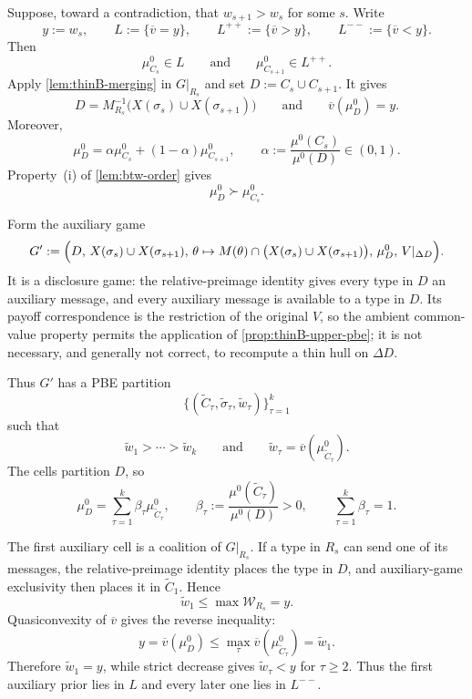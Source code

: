\documentclass[11pt]{article}
\newcommand{\W}{\mathcal{W}}
\begin{document}
Suppose, toward a contradiction, that $w_{s+1}>w_s$ for some $s$. Write
\[
    y:=w_s,\qquad
    L:=\{\overline v=y\},\qquad
    L^{++}:=\{\overline v>y\},\qquad
    L^{--}:=\{\overline v<y\}.
\]
Then
\[
    \mu^0_{C_s}\in L
    \qquad\text{and}\qquad
    \mu^0_{C_{s+1}}\in L^{++}.
\]
Apply \cref{lem:thinB-merging} in $G\vert_{R_s}$ and set $D:=C_s\cup C_{s+1}$. It gives
\[
    D=M^{-1}_{R_s}\bigl(X(\sigma_s)\cup X(\sigma_{s+1})\bigr)
    \qquad\text{and}\qquad
    \overline v(\mu^0_D)=y.
\]
Moreover,
\[
    \mu^0_D
    =
    \alpha\mu^0_{C_s}+(1-\alpha)\mu^0_{C_{s+1}},
    \qquad
    \alpha:=\frac{\mu^0(C_s)}{\mu^0(D)}\in(0,1).
\]
Property~(i) of \cref{lem:btw-order} gives
\begin{equation}\label{eq:thinB-rank-up}
    \mu^0_D\succ\mu^0_{C_s}.
\end{equation}

Form the auxiliary game
\[
    G'
    :=
    \Bigl(
    D,\,
    X(\sigma_s)\cup X(\sigma_{s+1}),\,
    \theta\mapsto M(\theta)\cap
    \bigl(X(\sigma_s)\cup X(\sigma_{s+1})\bigr),\,
    \mu^0_D,\,
    V\vert_{\Delta D}
    \Bigr).
\]
It is a disclosure game: the relative-preimage identity gives every type in $D$ an auxiliary message, and every auxiliary message is available to a type in $D$. Its payoff correspondence is the restriction of the original $V$, so the ambient common-value property permits the application of \cref{prop:thinB-upper-pbe}; it is not necessary, and generally not correct, to recompute a thin hull on $\Delta D$.

Thus $G'$ has a PBE partition
\[
    \{(\widetilde C_\tau,\widetilde\sigma_\tau,\widetilde w_\tau)\}_{\tau=1}^k
\]
such that
\[
    \widetilde w_1>\cdots>\widetilde w_k
    \qquad\text{and}\qquad
    \widetilde w_\tau=\overline v(\mu^0_{\widetilde C_\tau}).
\]
The cells partition $D$, so
\[
    \mu^0_D
    =
    \sum_{\tau=1}^k
    \beta_\tau\mu^0_{\widetilde C_\tau},
    \qquad
    \beta_\tau:=\frac{\mu^0(\widetilde C_\tau)}{\mu^0(D)}>0,
    \qquad
    \sum_{\tau=1}^k\beta_\tau=1.
\]

The first auxiliary cell is a coalition of $G\vert_{R_s}$. If a type in $R_s$ can send one of its messages, the relative-preimage identity places the type in $D$, and auxiliary-game exclusivity then places it in $\widetilde C_1$. Hence
\[
    \widetilde w_1\leq\max\W_{R_s}=y.
\]
Quasiconvexity of $\overline v$ gives the reverse inequality:
\[
    y
    =
    \overline v(\mu^0_D)
    \leq
    \max_\tau\overline v(\mu^0_{\widetilde C_\tau})
    =
    \widetilde w_1.
\]
Therefore $\widetilde w_1=y$, while strict decrease gives $\widetilde w_\tau<y$ for $\tau\geq2$. Thus the first auxiliary prior lies in $L$ and every later one lies in $L^{--}$.
\end{document}
